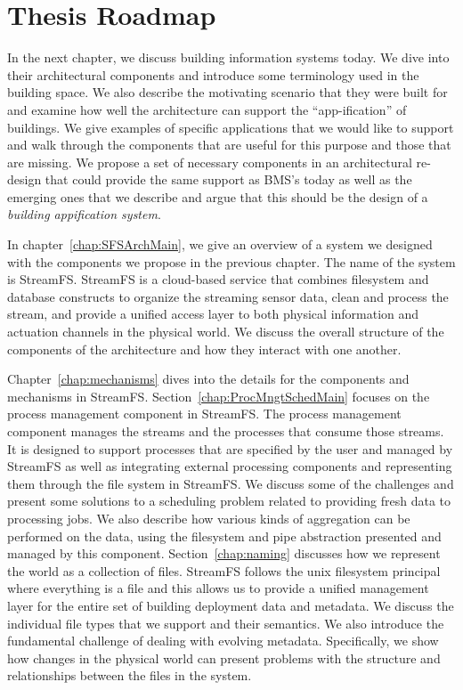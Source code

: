 \section{Thesis Roadmap}
In the next chapter, we discuss building information systems today.  We dive into their architectural components and introduce some terminology
used in the building space.  We also describe the motivating scenario that they were built for and examine how well the architecture 
can support the ``app-ification'' of buildings.  We give examples of specific applications that we would like to support
and walk through the components that are useful for this purpose and those that are missing.  We propose a set of necessary
components in an architectural re-design that could provide the same support as BMS's today as well as the emerging ones that we
describe and argue that this should be the design of a \emph{building appification system}.

In chapter~\ref{chap:SFSArchMain}, we give an overview of a system we designed with the components we propose in the previous
chapter.  The name of the system is StreamFS. StreamFS is a cloud-based service that combines filesystem and database constructs
to organize the streaming sensor data, clean and process the stream, and provide a unified access layer to both physical information
and actuation channels in the physical world.  We discuss the overall structure of the components of the architecture and how
they interact with one another.

Chapter~\ref{chap:mechanisms} dives into the details for the components and mechanisms in StreamFS.
Section~\ref{chap:ProcMngtSchedMain} focuses on the process management component in StreamFS.  The process management component
manages the streams and the processes that consume those streams.  It is designed to support processes that are specified by the user
and managed by StreamFS as well as integrating external processing components and representing them through the file system in StreamFS.
We discuss some of the challenges and present some solutions to a scheduling problem related to providing fresh data  to processing jobs.
We also describe how various kinds of aggregation can be performed on the data, using the filesystem and pipe abstraction
presented and managed by this component.
Section~\ref{chap:naming} discusses how we represent the world as a collection of files.  StreamFS follows the unix filesystem principal 
where everything is a file and this allows us to provide a unified management layer for the entire set of building deployment
data and metadata.  We discuss the individual file types that we support and their semantics.  We also introduce the fundamental
challenge of dealing with evolving metadata.  Specifically,  we show how changes in the physical world can present problems
with the structure and relationships between the files in the system.  

